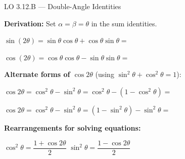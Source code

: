 \documentclass[10pt]{article}
\begin{document}
\vspace{0.08in}

\begin{notesbox}{LO 3.12.B --- Double-Angle Identities}

\textbf{Derivation:} Set $\alpha = \beta = \theta$ in the sum identities.

\vspace{4pt}
$\sin(2\theta) = \sin\theta\cos\theta + \cos\theta\sin\theta
= $ \ans{$2\sin\theta\cos\theta$}

\vspace{6pt}
$\cos(2\theta) = \cos\theta\cos\theta - \sin\theta\sin\theta
= $ \ans{$\cos^2\theta - \sin^2\theta$}

\vspace{8pt}
\textbf{Alternate forms of $\cos 2\theta$} (using $\sin^2\theta + \cos^2\theta = 1$):

\vspace{4pt}
$\cos 2\theta = \cos^2\theta - \sin^2\theta
= \cos^2\theta - (1 - \cos^2\theta) = $ 

\vspace{4pt}
$\cos 2\theta = \cos^2\theta - \sin^2\theta
= (1 - \sin^2\theta) - \sin^2\theta = $ 

\vspace{8pt}
\textbf{Rearrangements for solving equations:}

\vspace{4pt}
$\cos^2\theta = \dfrac{1 + \cos 2\theta}{2}$
\hspace{1.4cm}
$\sin^2\theta = \dfrac{1 - \cos 2\theta}{2}$

\end{notesbox}

\vspace{0.08in}
\end{document}
